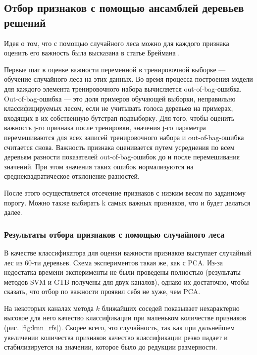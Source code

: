 \par
\subsection{Отбор признаков с помощью ансамблей деревьев решений}
Идея о том, что с помощью случайного леса можно для каждого признака оценить его важность была высказана в статье Бреймана \cite{breiman}.
\par
Первые шаг в оценке важности переменной в тренировочной выборке --- обучение случайного леса на этих данных. Во время процесса построения модели для каждого элемента тренировочного набора вычисляется out-of-bag-ошибка.
Out-of-bag-ошибка --- это доля примеров обучающей выборки, неправильно классифицируемых лесом, если не учитывать голоса деревьев на примерах, входящих в их собственную бутстрап подвыборку.
Для того, чтобы оценить важность j-го признака после тренировки, значения j-го параметра перемешиваются для всех записей тренировочного набора и out-of-bag-ошибка считается снова. Важность признака оценивается путем усреднения по всем деревьям разности показателей out-of-bag-ошибок до и после перемешивания значений. При этом значения таких ошибок нормализуются на среднеквадратическое отклонение разностей.
\par
После этого осуществляется отсечение признаков с низким весом по заданному порогу. Можно также выбирать k самых важных признаков, что и будет делаться далее.
\subsubsection*{Результаты отбора признаков с помощью случайного леса}
В качестве классификатора для оценки важности признаков выступает случайный лес из 60-ти деревьев. Схема экспериментов такая же, как с PCA. Из-за недостатка времени эксперименты не были проведены полностью (результаты методов SVM и GTB получены для двух каналов), однако их достаточно, чтобы сказать, что отбор по важности проявил себя не хуже, чем PCA.
\par
На некоторых каналах метода \(k\) ближайших соседей показывает нехарактерно высокое для него качество классификации при маленьком количестве признаков (рис. \ref{fig:knn_rfs}). Скорее всего, это случайность, так как при дальнейшем увеличении количества признаков качество классификации резко падает и стабилизируется на значении, которое было до редукции размерности.

